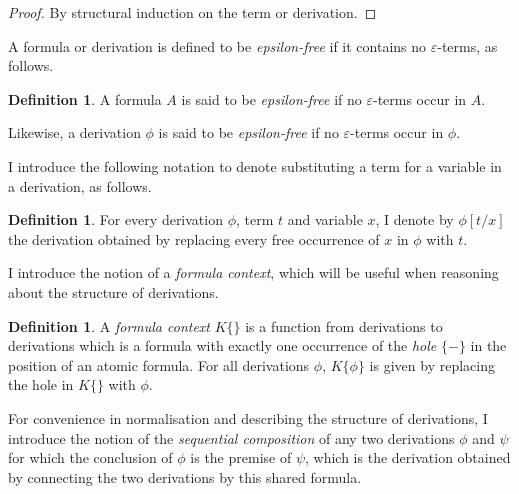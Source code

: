 \documentclass[10pt]{article}
\theoremstyle{definition}\newtheorem{remark}[theorem]{Remark}
\theoremstyle{definition}\newtheorem{example}[theorem]{Example}
\theoremstyle{definition}\newtheorem{definition}[theorem]{Definition}
\begin{document}
	\begin{proof}
		By structural induction on the term or derivation.
	\end{proof}

	A formula or derivation is defined to be \textit{epsilon-free} if it contains no $\varepsilon$-terms, as follows.
	
	\begin{definition}		
		A formula $A$ is said to be \textit{epsilon-free} if no $\varepsilon$-terms occur in $A$.
		
		Likewise, a derivation $\phi$ is said to be \textit{epsilon-free} if no $\varepsilon$-terms occur in $\phi$.
	\end{definition}

	I introduce the following notation to denote substituting a term for a variable in a derivation, as follows.
	
	\begin{definition}
		For every derivation $\phi$, term $t$ and variable $x$, I denote by $\phi[t / x]$ the derivation obtained by replacing every free occurrence of $x$ in $\phi$ with $t$.
	\end{definition}

	I introduce the notion of a \textit{formula context}, which will be useful when reasoning about the structure of derivations.
	
	\begin{definition}
		A \textit{formula context} $K\{\}$ is a function from derivations to derivations which is a formula with exactly one occurrence of the \textit{hole} $\{-\}$ in the position of an atomic formula. For all derivations $\phi$, $K \{\phi\}$ is given by replacing the hole in $K \{\}$ with $\phi$.
	\end{definition}
	
	For convenience in normalisation and describing the structure of derivations, I introduce the notion of the \textit{sequential composition} of any two derivations $\phi$ and $\psi$ for which the conclusion of $\phi$ is the premise of $\psi$, which is the derivation obtained by connecting the two derivations by this shared formula.
	
\end{document}
